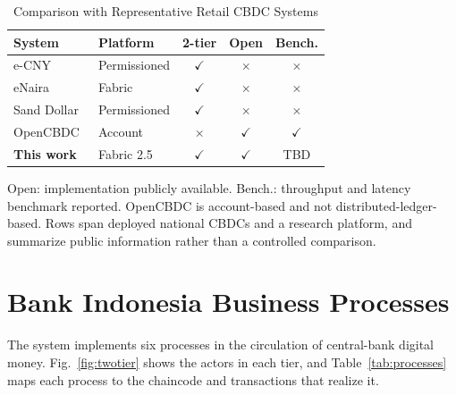 \documentclass[conference]{IEEEtran}
\begin{document}
\begin{table}[!t]
	\caption{Comparison with Representative Retail CBDC Systems}
	\label{tab:compare}
	\centering
	\footnotesize
	\setlength{\tabcolsep}{3pt}
	\begin{tabular}{llccc}
		\toprule
		\textbf{System} & \textbf{Platform} & \textbf{2-tier} & \textbf{Open} & \textbf{Bench.} \\
		\midrule
		e-CNY~\cite{pboc2021ecny}                           & Permissioned & $\checkmark$ & $\times$     & $\times$     \\
		eNaira~\cite{ree2023enaira}                         & Fabric       & $\checkmark$ & $\times$     & $\times$     \\
		Sand Dollar~\cite{centralbankbahamas2020sanddollar} & Permissioned & $\checkmark$ & $\times$     & $\times$     \\
		OpenCBDC~\cite{Lovejoy2022A}                        & Account      & $\times$     & $\checkmark$ & $\checkmark$ \\
		\textbf{This work}                                  & Fabric 2.5   & $\checkmark$ & $\checkmark$ & TBD \\
		\bottomrule
	\end{tabular}

	\vspace{2pt}
	{\scriptsize Open: implementation publicly available. Bench.: throughput and
		latency benchmark reported.
		OpenCBDC is account-based and not distributed-ledger-based. Rows span
		deployed national CBDCs and a research platform, and summarize public
		information rather than a controlled comparison.}
\end{table}

\section{Bank Indonesia Business Processes}
\label{sec:bp}
The system implements six processes in the circulation of central-bank digital
money. Fig.~\ref{fig:twotier} shows the actors in each tier, and
Table~\ref{tab:processes} maps each process to the chaincode and transactions
that realize it.
\end{document}
